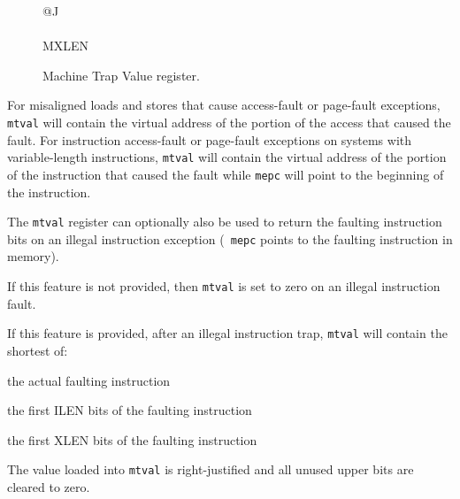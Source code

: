 \begin{figure}[h!]
{\footnotesize
\begin{center}
\begin{tabular}{@{}J}
 \\
\hline
{} \\
\hline
MXLEN \\
\end{tabular}
\end{center}
}
\vspace{-0.1in}
\caption{Machine Trap Value register.}
\label{mtvalreg}
\end{figure}

For misaligned loads and stores that cause access-fault or page-fault exceptions,
{\tt mtval} will contain the virtual address of the portion of the access that
caused the fault.  For instruction access-fault or page-fault exceptions on
systems with variable-length instructions, {\tt mtval} will contain the
virtual address of the portion of the instruction that caused the fault while
{\tt mepc} will point to the beginning of the instruction.

The {\tt mtval} register can optionally also be used to return the
faulting instruction bits on an illegal instruction exception ({\tt
  mepc} points to the faulting instruction in memory).

If this feature is not provided, then {\tt mtval} is set to zero on
an illegal instruction fault.

If this feature is provided, after an illegal instruction trap, {\tt mtval}
will contain the shortest of:
\begin{compactitem}
\item the actual faulting instruction
\item the first ILEN bits of the faulting instruction
\item the first XLEN bits of the faulting instruction
\end{compactitem}
The value loaded into {\tt mtval} is right-justified and all unused upper
bits are cleared to zero.


